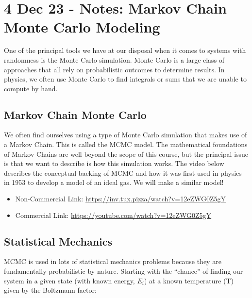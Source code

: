 \section{4 Dec 23 - Notes: Markov Chain Monte Carlo
Modeling}\label{dec-23---notes-markov-chain-monte-carlo-modeling}

One of the principal tools we have at our disposal when it comes to
systems with randomness is the Monte Carlo simulation. Monte Carlo is a
large class of approaches that all rely on probabilistic outcomes to
determine results. In physics, we often use Monte Carlo to find
integrals or sums that we are unable to compute by hand.

\subsection{Markov Chain Monte Carlo}\label{markov-chain-monte-carlo}

We often find ourselves using a type of Monte Carlo simulation that
makes use of a Markov Chain. This is called the MCMC model. The
mathematical foundations of Markov Chains are well beyond the scope of
this course, but the principal issue is that we want to describe is how
this simulation works. The video below describes the conceptual backing
of MCMC and how it was first used in physics in 1953 to develop a model
of an ideal gas. We will make a similar model!

\href{https://inv.tux.pizza/watch?v=12eZWG0Z5gY}{\pandocbounded{\texttt{[image: https://markdown-videos-api.jorgenkh.no/youtube/12eZWG0Z5gY?width=720\&height=405]}}}

\begin{itemize}
\tightlist
\item
  Non-Commercial Link: \url{https://inv.tux.pizza/watch?v=12eZWG0Z5gY}
\item
  Commercial Link: \url{https://youtube.com/watch?v=12eZWG0Z5gY}
\end{itemize}

\subsection{Statistical Mechanics}\label{statistical-mechanics}

MCMC is used in lots of statistical mechanics problems because they are
fundamentally probabilistic by nature. Starting with the ``chance'' of
finding our system in a given state (with known energy, \(E_i\)) at a
known temperature (T) given by the Boltzmann factor:

